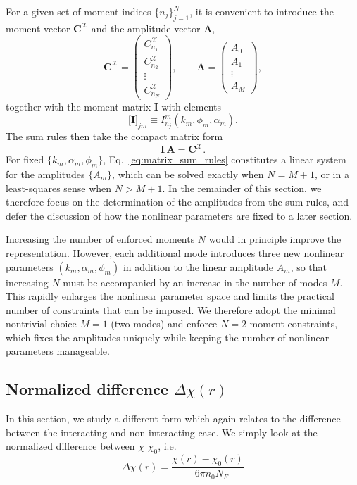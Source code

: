 \documentclass[aps,onecolumn]{revtex4-2}
\begin{document}
For a given set of moment indices \(\{n_j\}_{j=1}^N\), it is convenient to
introduce the moment vector \(\mathbf{C}^{\mathcal X}\) and the amplitude vector
\(\mathbf A\),
\[
    \mathbf{C}^{\mathcal X} =
    \begin{pmatrix}
        C^{\mathcal X}_{n_1} \\
        C^{\mathcal X}_{n_2} \\
        \vdots               \\
        C^{\mathcal X}_{n_N}
    \end{pmatrix},
    \qquad
    \mathbf A =
    \begin{pmatrix}
        A_0    \\
        A_1    \\
        \vdots \\
        A_M
    \end{pmatrix},
\]
together with the moment matrix \(\mathbf I\) with elements
\[
    \bigl[\mathbf I\bigr]_{j m} \equiv I_{n_j}^m(k_m,\phi_m,\alpha_m).
\]
The sum rules then take the compact matrix form
\begin{equation}
    \mathbf I\,\mathbf A = \mathbf C^{\mathcal X}.
    \label{eq:matrix_sum_rules}
\end{equation}
For fixed \(\{k_m,\alpha_m,\phi_m\}\), Eq.~\eqref{eq:matrix_sum_rules} constitutes
a linear system for the amplitudes \(\{A_m\}\), which can be solved exactly when \(N=M+1\), or in a least-squares sense when \(N>M+1\). In the remainder of this
section, we therefore focus on the determination of the amplitudes from the sum
rules, and defer the discussion of how the nonlinear parameters are fixed to a
later section.

Increasing the number of enforced moments \(N\) would in principle improve the representation. However, each additional mode introduces three new nonlinear parameters \((k_m,\alpha_m,\phi_m)\) in addition to the linear amplitude \(A_m\), so that increasing \(N\) must be accompanied by an increase in the number of modes \(M\). This rapidly enlarges the nonlinear parameter space and limits the practical number of constraints that can be imposed. We therefore adopt the minimal nontrivial choice \(M=1\) (two modes) and enforce \(N=2\) moment constraints, which fixes the amplitudes uniquely while keeping the number of nonlinear parameters manageable.



\subsection{Normalized difference $\Delta{\chi}(r)$}
In this section, we study a different form which again relates to the difference between the interacting and non-interacting case. We simply look at the normalized difference between $\chi$ $\chi_0$, i.e.
\begin{equation}\label{delta_chi_definition}
    \Delta{\chi}(r) = \frac{\chi(r)-\chi_0(r)}{-6\pi n_0 N_F}
\end{equation}
\end{document}
